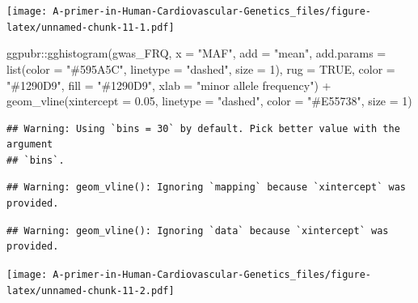 \documentclass[
]{book}
\newenvironment{Shaded}{\begin{snugshade}}{\end{snugshade}}
\newcommand{\AttributeTok}[1]{\textcolor[rgb]{0.77,0.63,0.00}{#1}}
\newcommand{\ConstantTok}[1]{\textcolor[rgb]{0.00,0.00,0.00}{#1}}
\newcommand{\DecValTok}[1]{\textcolor[rgb]{0.00,0.00,0.81}{#1}}
\newcommand{\FloatTok}[1]{\textcolor[rgb]{0.00,0.00,0.81}{#1}}
\newcommand{\FunctionTok}[1]{\textcolor[rgb]{0.00,0.00,0.00}{#1}}
\newcommand{\NormalTok}[1]{#1}
\newcommand{\SpecialCharTok}[1]{\textcolor[rgb]{0.00,0.00,0.00}{#1}}
\newcommand{\StringTok}[1]{\textcolor[rgb]{0.31,0.60,0.02}{#1}}
\begin{document}
\texttt{[image: A-primer-in-Human-Cardiovascular-Genetics\_files/figure-latex/unnamed-chunk-11-1.pdf]}

\begin{Shaded}
\begin{Highlighting}[]
\NormalTok{ggpubr}\SpecialCharTok{::}\FunctionTok{gghistogram}\NormalTok{(gwas\_FRQ, }\AttributeTok{x =} \StringTok{"MAF"}\NormalTok{,}
                    \AttributeTok{add =} \StringTok{"mean"}\NormalTok{, }\AttributeTok{add.params =} \FunctionTok{list}\NormalTok{(}\AttributeTok{color =} \StringTok{"\#595A5C"}\NormalTok{, }\AttributeTok{linetype =} \StringTok{"dashed"}\NormalTok{, }\AttributeTok{size =} \DecValTok{1}\NormalTok{),}
                    \AttributeTok{rug =} \ConstantTok{TRUE}\NormalTok{,}
                    \AttributeTok{color =} \StringTok{"\#1290D9"}\NormalTok{, }\AttributeTok{fill =} \StringTok{"\#1290D9"}\NormalTok{,}
                    \AttributeTok{xlab =} \StringTok{"minor allele frequency"}\NormalTok{) }\SpecialCharTok{+}
  \FunctionTok{geom\_vline}\NormalTok{(}\AttributeTok{xintercept =} \FloatTok{0.05}\NormalTok{, }\AttributeTok{linetype =} \StringTok{"dashed"}\NormalTok{,}
                \AttributeTok{color =} \StringTok{"\#E55738"}\NormalTok{, }\AttributeTok{size =} \DecValTok{1}\NormalTok{)}
\end{Highlighting}
\end{Shaded}

\begin{verbatim}
## Warning: Using `bins = 30` by default. Pick better value with the argument
## `bins`.
\end{verbatim}

\begin{verbatim}
## Warning: geom_vline(): Ignoring `mapping` because `xintercept` was provided.
\end{verbatim}

\begin{verbatim}
## Warning: geom_vline(): Ignoring `data` because `xintercept` was provided.
\end{verbatim}

\texttt{[image: A-primer-in-Human-Cardiovascular-Genetics\_files/figure-latex/unnamed-chunk-11-2.pdf]}
\end{document}
